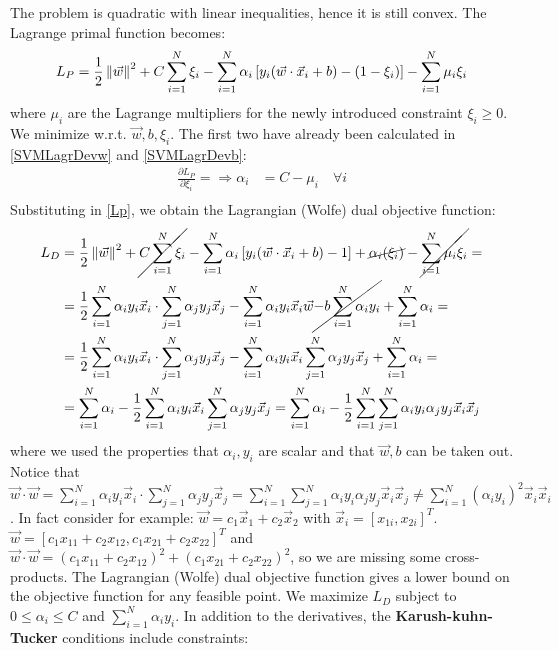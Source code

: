 \documentclass[12pt, letterpaper]{article}
\theoremstyle{definition}
\DeclarePairedDelimiter\autobracket{(}{)}
\newcommand{\br}[1]{\autobracket*{#1}}
\newcommand\norm[1]{\left\lVert#1\right\rVert}
\begin{document}
The problem is quadratic with linear inequalities, hence it is still convex. The Lagrange primal function becomes:
\begin{equation}
L_P = \frac{1}{2}\norm{ \vec{w}}^2 + C \sum_{i=1}^N \xi_i - \sum_{i=1}^N \alpha_i \left[y_i\br{
\vec{w} \cdot \vec{x}_i+b}-\br{1-\xi_i}\right] - \sum_{i=1}^N \mu_i \xi_i 
\label{Lp}
\end{equation}
where $\mu_i$ are the Lagrange multipliers for the newly introduced constraint $\xi_i\ge 0$.
We minimize w.r.t. $\vec{w}, b, \xi_i$. The first two have already been calculated in \ref{SVMLagrDevw} and \ref{SVMLagrDevb}:
\begin{equation}
\begin{aligned}
\frac{\partial L_P}{\partial \xi_i} = \Rightarrow \alpha_i &= C - \mu_i \quad \forall i\\
\end{aligned}
\end{equation}
Substituting in \ref{Lp}, we obtain the Lagrangian (Wolfe) dual objective function:
\begin{equation}
\begin{aligned}
L_D &=  \frac{1}{2}\norm{ \vec{w}}^2 + \cancel{C \sum_{i=1}^N \xi_i} - \sum_{i=1}^N \alpha_i \left[y_i\br{
\vec{w} \cdot \vec{x}_i+b} -1\right]+\cancel{\alpha_i\br{\xi_i}} - \cancel{\sum_{i=1}^N \mu_i \xi_i} = \\
&=\frac{1}{2}\sum_{i=1}^N  \alpha_i y_i \vec{x}_i \cdot \sum_{j=1}^N  \alpha_j y_j \vec{x}_j- \sum_{i=1}^N \alpha_i y_i \vec{x}_i\vec{w} \cancel{- b\sum_{i=1}^N \alpha_i y_i}+ \sum_{i=1}^N \alpha_i =\\
&=\frac{1}{2}\sum_{i=1}^N  \alpha_i y_i \vec{x}_i \cdot \sum_{j=1}^N  \alpha_j y_j \vec{x}_j- \sum_{i=1}^N \alpha_i y_i \vec{x}_i\sum_{j=1}^N \alpha_j y_j \vec{x}_j+ \sum_{i=1}^N \alpha_i =\\
&= \sum_{i=1}^N \alpha_i - \frac{1}{2}\sum_{i=1}^N \alpha_i y_i \vec{x}_i\sum_{j=1}^N \alpha_j y_j \vec{x}_j = \sum_{i=1}^N \alpha_i - \frac{1}{2}\sum_{i=1}^N\sum_{j=1}^N \alpha_i y_i \alpha_j y_j\vec{x}_i  \vec{x}_j
\end{aligned}
\label{LagrangeDueal}
\end{equation}
where we used the properties that $\alpha_i, y_i$ are scalar and that $\vec{w}, b$ can be taken out. Notice that $\vec{w}\cdot \vec{w}  = \sum_{i=1}^N \alpha_i y_i \vec{x}_i\cdot\sum_{j=1}^N\alpha_j y_j \vec{x}_j =\sum_{i=1}^N \sum_{j=1}^N \alpha_i y_i \alpha_j y_j  \vec{x}_i\vec{x}_j \ne \sum_{i=1}^N  (\alpha_i y_i)^2 \vec{x}_i\vec{x}_i$. In fact consider for example: $\vec{w} = c_1\vec{x}_1 + c_2\vec{x}_2$ with $\vec{x}_i = \left[x_{1i}, x_{2i}\right]^T$. $\vec{w} = \left[ c_1x_{11}+c_2x_{12}, c_1x_{21}+c_2x_{22} \right]^T$ and $\vec{w}\cdot \vec{w} = (c_1x_{11}+c_2x_{12})^2+(c_1x_{21}+c_2x_{22})^2$, so we are missing some cross-products. The Lagrangian (Wolfe) dual objective function gives a lower bound on the objective function for any feasible point. We maximize $L_D$ subject to $0\le \alpha_i\le C$ and $\sum_{i=1}^N\alpha_iy_i$. In addition to the derivatives, the \textbf{Karush-kuhn-Tucker} conditions include constraints:
\end{document}
